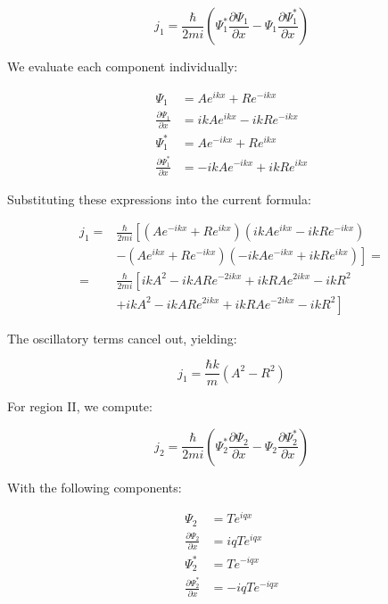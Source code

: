 \begin{equation}
j_{1}=\frac{\hbar}{2 m i}\left(\Psi_{1}^{*} \frac{\partial \Psi_{1}}{\partial x}-\Psi_{1} \frac{\partial \Psi_{1}^{*}}{\partial x}\right)
\end{equation}

We evaluate each component individually:

\begin{align}
\Psi_{1} & =A e^{i k x}+R e^{-i k x} \\
\frac{\partial \Psi_{1}}{\partial x} & =i k A e^{i k x}-i k R e^{-i k x} \\
\Psi_{1}^{*} & =A e^{-i k x}+R e^{i k x}  \\
\frac{\partial \Psi_{1}^{*}}{\partial x} & =-i k A e^{-i k x}+i k R e^{i k x}
\end{align}

Substituting these expressions into the current formula:

\begin{align}
j_{1}= & \frac{\hbar}{2 m i}\left[\left(A e^{-i k x}+R e^{i k x}\right)\left(i k A e^{i k x}-i k R e^{-i k x}\right)\right. \\
& \left.-\left(A e^{i k x}+R e^{-i k x}\right)\left(-i k A e^{-i k x}+i k R e^{i k x}\right)\right]= \\
= & \frac{\hbar}{2 m i}\left[i k A^{2}-i k A R e^{-2 i k x}+i k R A e^{2 i k x}-i k R^{2}\right.  \\
& \left.+i k A^{2}-i k A R e^{2 i k x}+i k R A e^{-2 i k x}-i k R^{2}\right]
\end{align}

The oscillatory terms cancel out, yielding:

\begin{equation}
j_{1}=\frac{\hbar k}{m}\left(A^{2}-R^{2}\right)
\end{equation}

For region II, we compute:

\begin{equation}
j_{2}=\frac{\hbar}{2 m i}\left(\Psi_{2}^{*} \frac{\partial \Psi_{2}}{\partial x}-\Psi_{2} \frac{\partial \Psi_{2}^{*}}{\partial x}\right)
\end{equation}

With the following components:

\begin{align}
\Psi_{2} & =T e^{i q x} \\
\frac{\partial \Psi_{2}}{\partial x} & =i q T e^{i q x}  \\
\Psi_{2}^{*} & =T e^{-i q x} \\
\frac{\partial \Psi_{2}^{*}}{\partial x} & =-i q T e^{-i q x}
\end{align}

